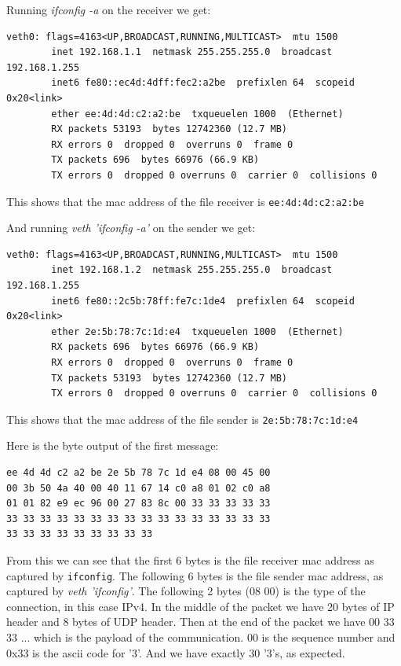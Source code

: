 \documentclass[paper=a4, fontsize=11pt]{scrartcl}
\numberwithin{equation}{section}		%
\numberwithin{figure}{section}			%
\numberwithin{table}{section}				%
\begin{document}
Running \textit{ifconfig -a} on the receiver we get:
\begin{lstlisting}
veth0: flags=4163<UP,BROADCAST,RUNNING,MULTICAST>  mtu 1500
        inet 192.168.1.1  netmask 255.255.255.0  broadcast 192.168.1.255
        inet6 fe80::ec4d:4dff:fec2:a2be  prefixlen 64  scopeid 0x20<link>
        ether ee:4d:4d:c2:a2:be  txqueuelen 1000  (Ethernet)
        RX packets 53193  bytes 12742360 (12.7 MB)
        RX errors 0  dropped 0  overruns 0  frame 0
        TX packets 696  bytes 66976 (66.9 KB)
        TX errors 0  dropped 0 overruns 0  carrier 0  collisions 0
\end{lstlisting}

This shows that the mac address of the file receiver is \texttt{ee:4d:4d:c2:a2:be}

And running \textit{veth 'ifconfig -a'} on the sender we get:
\begin{lstlisting}
veth0: flags=4163<UP,BROADCAST,RUNNING,MULTICAST>  mtu 1500
        inet 192.168.1.2  netmask 255.255.255.0  broadcast 192.168.1.255
        inet6 fe80::2c5b:78ff:fe7c:1de4  prefixlen 64  scopeid 0x20<link>
        ether 2e:5b:78:7c:1d:e4  txqueuelen 1000  (Ethernet)
        RX packets 696  bytes 66976 (66.9 KB)
        RX errors 0  dropped 0  overruns 0  frame 0
        TX packets 53193  bytes 12742360 (12.7 MB)
        TX errors 0  dropped 0 overruns 0  carrier 0  collisions 0
\end{lstlisting}

This shows that the mac address of the file sender is \texttt{2e:5b:78:7c:1d:e4}

Here is the byte output of the first message:
\begin{lstlisting}
ee 4d 4d c2 a2 be 2e 5b 78 7c 1d e4 08 00 45 00
00 3b 50 4a 40 00 40 11 67 14 c0 a8 01 02 c0 a8
01 01 82 e9 ec 96 00 27 83 8c 00 33 33 33 33 33
33 33 33 33 33 33 33 33 33 33 33 33 33 33 33 33
33 33 33 33 33 33 33 33 33
\end{lstlisting}

From this we can see that the first 6 bytes is the file receiver mac address
as captured by \texttt{ifconfig}.
The following 6 bytes is the file sender mac address, as captured by \textit{veth 'ifconfig'}.
The following 2 bytes (08 00) is the type of the connection, in this case IPv4.
In the middle of the packet we have 20 bytes of IP header and 8 bytes of UDP header.
Then at the end of the packet we have 00 33 33 ... which is the payload of the communication.
00 is the sequence number and 0x33 is the ascii code for '3'. And we have exactly 30 '3's, as expected.
\end{document}
